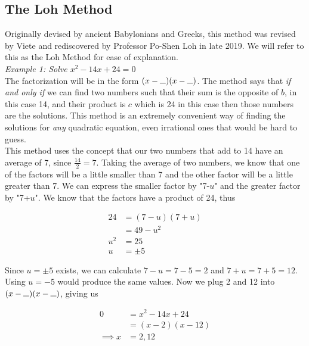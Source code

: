 \documentclass{article}
\newcommand*{\longunderscore}
{
\rule{0.25cm}{0.15mm}
}
\begin{document}
    \subsection{The Loh Method}

    Originally devised by ancient Babylonians and Greeks, this method was revised by Viete
    and rediscovered by Professor Po-Shen Loh in late 2019. We will refer to this as the
    Loh Method for ease of explanation. \\

    \noindent \color{blue} \textit{Example 1: Solve $x^2-14x+24=0$} \color{black} \\
    The factorization will be in the form $(x-\longunderscore)(x-\longunderscore)$.
    The method says that \textit{if and only if} we can find two numbers such that their sum
    is the opposite of $b$, in this case 14, and their product is $c$ which is 24 in this case
    then those numbers are the solutions. This method is an extremely convenient way of finding
    the solutions for \textit{any} quadratic equation, even irrational ones that would be hard
    to guess. \\

    \noindent This method uses the concept that our two numbers that add to 14 have an average
    of 7, since $\frac{14}{2} = 7$. Taking the average of two numbers, we know that one of the
    factors will be a little smaller than 7 and the other factor will be a little greater than
    7. We can express the smaller factor by "7-$u$" and the greater factor by "7+$u$". We know
    that the factors have a product of 24, thus

    \begin{align*}
        24  &= (7-u)(7+u) \\
        &= 49 - u^2 \\
        u^2 &= 25 \\
        u   &= \pm 5
    \end{align*}

    \noindent Since $u = \pm 5$ exists, we can calculate $7-u = 7-5 = 2$ and $7+u=7+5=12$.
    Using $u=-5$ would produce the same values. Now we plug 2 and 12 into
    $(x-\longunderscore)(x-\longunderscore)$, giving us

    \begin{align*}
        0          &= x^2-14x+24 \\
        &= (x-2)(x-12) \\
        \implies x &= 2,12
    \end{align*}
\end{document}
